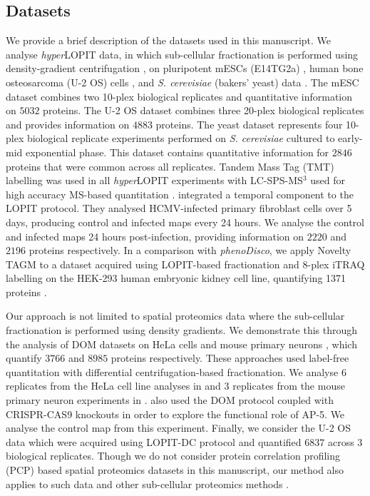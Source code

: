 \documentclass[12pt,english]{article}
\begin{document}
\subsection{Datasets}
We provide a brief description of the datasets used in this manuscript. We analyse \textit{hyper}LOPIT data, in which sub-cellular fractionation is performed using density-gradient centrifugation \citep{Dunkley:2004, Dunkley:2006, Mulvey:2017}, on pluripotent mESCs (E14TG2a) \citep{hyper}, human bone osteosarcoma (U-2 OS) cells \citep{Thul:2017, DC:2018}, and \textit{S. cerevisiae} (bakers' yeast) data \citep{Nightingale::2019}. The mESC dataset combines two 10-plex biological replicates and quantitative information on $5032$ proteins. The U-2 OS dataset combines three 20-plex biological replicates and provides information on $4883$ proteins. The yeast dataset represents four 10-plex biological replicate experiments performed on \textit{S. cerevisiae} cultured to early-mid exponential phase. This dataset contains quantitative information for $2846$ proteins that were common across all replicates. Tandem Mass Tag (TMT) \citep{Thompson:2003} labelling was used in all \textit{hyper}LOPIT experiments with LC-SPS-MS$^{3}$ used for high accuracy MS-based quantitation \citep{Ting:2011, Mcalister::2014}. \cite{Jean_Beltran:2016} integrated a temporal component to the LOPIT protocol. They analysed HCMV-infected primary fibroblast cells over 5 days, producing control and infected maps every 24 hours. We analyse the control and infected maps 24 hours post-infection, providing information on $2220$ and $2196$ proteins respectively. In a comparison with \textit{phenoDisco}, we apply Novelty TAGM to a dataset acquired using LOPIT-based fractionation and 8-plex iTRAQ labelling on the HEK-293 human embryonic kidney cell line, quantifying 1371 proteins \citep{Breckels:2013}.

Our approach is not limited to spatial proteomics data where the sub-cellular fractionation is performed using density gradients. We demonstrate this through the analysis of DOM datasets on HeLa cells and mouse primary neurons \citep{Itzhak:2016, Itzhak::2017}, which quantify $3766$ and $8985$ proteins respectively. These approaches used label-free quantitation with differential centrifugation-based fractionation. We analyse $6$ replicates from the HeLa cell line analyses in \cite{Itzhak:2016} and $3$ replicates from the mouse primary neuron experiments in \cite{Itzhak::2017}. \cite{Hirst:2018} also used the DOM protocol coupled with CRISPR-CAS9 knockouts in order to explore the functional role of AP-5. We analyse the control map from this experiment. Finally, we consider the U-2 OS data which were acquired using LOPIT-DC protocol \citep{DC:2018} and quantified $6837$ across $3$ biological replicates. Though we do not consider protein correlation profiling (PCP) based spatial proteomics datasets in this manuscript, our method also applies to such data \citep{Foster:2006, kristensen:2012, kristensen:2014} and other sub-cellular proteomics methods \citep{Orre:2019}.
\end{document}
